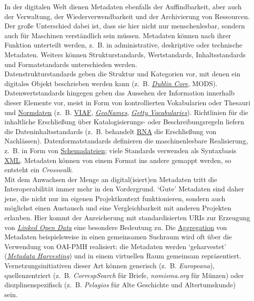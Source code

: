 \documentclass{article}
\begin{document}
        In der digitalen Welt dienen Metadaten ebenfalls der Auffindbarkeit, aber auch der Verwaltung, der Wiederverwendbarkeit und der Archivierung von Ressourcen. Der große Unterschied dabei ist, dass sie hier nicht nur menschenlesbar, sondern auch für Maschinen verständlich sein müssen. Metadaten können nach ihrer Funktion unterteilt werden, z. B. in administrative, deskriptive oder technische Metadaten. Weiters können Strukturstandards, Wertstandards, Inhaltsstandards und Formatstandards unterschieden werden.\\
            
        Datenstrukturstandards geben die Struktur und Kategorien vor, mit denen ein digitales Objekt beschrieben werden kann (z. B. \emph{\href{http://gams.uni-graz.at/o:konde.128}{Dublin Core}}, MODS). Datenwertstandards hingegen geben das Aussehen der Information innerhalb dieser Elemente vor, meist in Form von kontrollierten Vokabularien oder Thesauri und \href{http://gams.uni-graz.at/o:konde.147}{Normdaten} (z. B. \href{http://gams.uni-graz.at/o:konde.111}{VIAF}, \emph{\href{http://gams.uni-graz.at/o:konde.107}{GeoNames}}, \emph{\href{http://gams.uni-graz.at/o:konde.108}{Getty Vocabularies}}). Richtlinien für die inhaltliche Erschließung über Katalogisierungs- oder Beschreibungsregeln liefern die Dateninhaltsstandards (z. B. behandelt \href{http://gams.uni-graz.at/o:konde.165}{RNA} die Erschließung von Nachlässen). Datenformatstandards definieren die maschinenlesbare Realisierung, z. B. in Form von \href{http://gams.uni-graz.at/o:konde.166}{Schemadateien}; viele Standards verwenden als Syntaxbasis \href{http://gams.uni-graz.at/o:konde.215}{XML}. Metadaten können von einem Format ins andere gemappt werden, so entsteht ein \emph{Crosswalk}.\\
            
        Mit dem Anwachsen der Menge an digital(isiert)en Metadaten tritt die Interoperabilität immer mehr in den Vordergrund. ‘Gute’ Metadaten sind daher jene, die nicht nur im eigenen Projektkontext funktionieren, sondern auch möglichst einen Austausch und eine Vergleichbarkeit mit anderen Projekten erlauben. Hier kommt der Anreicherung mit standardisierten URIs zur Erzeugung von \emph{\href{http://gams.uni-graz.at/o:konde.8}{Linked Open Data}} eine besondere Bedeutung zu. Die \href{http://gams.uni-graz.at/o:konde.49}{Aggregation} von Metadaten beispielsweise in einen gemeinsamen Suchraum wird oft über die Verwendung von OAI-PMH realisiert: die Metadaten werden ‘geharvestet’ (\emph{\href{http://gams.uni-graz.at/o:konde.10}{Metadata Harvesting}}) und in einem virtuellen Raum gemeinsam repräsentiert. Vernetzungsinitiativen dieser Art können generisch (z. B. \emph{Europeana}), quellenzentriert (z. B. \emph{CorrespSearch} für Briefe, \emph{nomisma.org} für Münzen) oder diszplinenspezifisch (z. B. \emph{Pelagios} für Alte Geschichte und Altertumskunde) sein.\\
            
\end{document}
